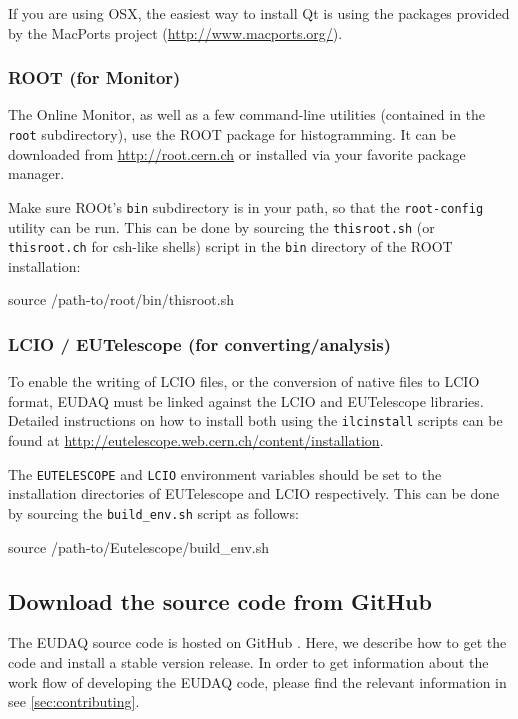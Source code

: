 If you are using OSX, the easiest way to install Qt is using the
packages provided by the MacPorts project (\url{http://www.macports.org/}).

\subsubsection{ROOT (for Monitor)}
\label{sec:Root}
The Online Monitor, as well as a few command-line utilities (contained in the \texttt{root} subdirectory), use the ROOT package for histogramming.
It can be downloaded from \url{http://root.cern.ch} or installed via
your favorite package manager.

Make sure ROOt's \texttt{bin} subdirectory is in your path, so that the \texttt{root-config} utility can be run.
This can be done by sourcing the \texttt{thisroot.sh} (or \texttt{thisroot.ch} for csh-like shells)
script in the \texttt{bin} directory of the ROOT installation:
\begin{listing}[mybash]
source /path-to/root/bin/thisroot.sh
\end{listing}

\subsubsection{LCIO / EUTelescope (for converting/analysis)}
\label{sec:LCIO-EUTel}
To enable the writing of \gls{LCIO} files, or the conversion of native files to \gls{LCIO} format,
EUDAQ must be linked against the \gls{LCIO} and EUTelescope libraries.
Detailed instructions on how to install both using the
\texttt{ilcinstall} scripts can be found at \url{http://eutelescope.web.cern.ch/content/installation}.

The \texttt{EUTELESCOPE} and \texttt{LCIO} environment variables should be set to the
installation directories of EUTelescope and LCIO respectively.
This can be done by sourcing the \texttt{build\_env.sh} script as follows:
\begin{listing}[mybash]
source /path-to/Eutelescope/build_env.sh
\end{listing}

\subsection{Download the source code from GitHub}
\label{sec:downloadingEUDAQ}

The EUDAQ source code is hosted on GitHub \cite{githubEUDAQ}. 
Here, we describe how to get the code and install a stable version release. 
In order to get information about the work flow of developing the EUDAQ code, please find the relevant information in see \autoref{sec:contributing}.

